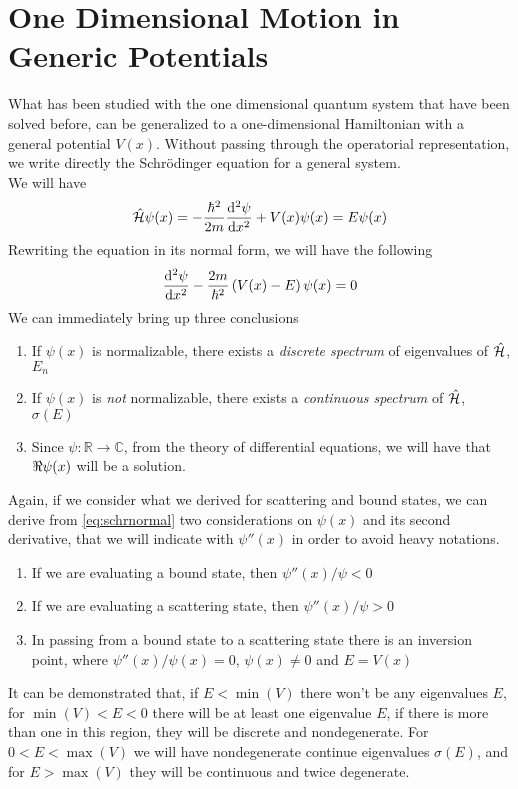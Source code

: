 \documentclass[../qm.tex]{subfiles}
\begin{document}
	\section{One Dimensional Motion in Generic Potentials}
	What has been studied with the one dimensional quantum system that have been solved before, can be generalized to a one-dimensional Hamiltonian with a general potential $V(x)$. Without passing through the operatorial representation, we write directly the Schrödinger equation for a general system.\\
	We will have
	\begin{equation*}
		\opr{\ham}\psi(x)=-\frac{\hbar^2}{2m}\derivative[2]{\psi}{x}+V(x)\psi(x)=E\psi(x)
	\end{equation*}
	Rewriting the equation in its normal form, we will have the following
	\begin{equation}
		\derivative[2]{\psi}{x}-\frac{2m}{\hbar^2}\left( V(x)-E \right)\psi(x)=0
		\label{eq:schrnormal}
	\end{equation}
	We can immediately bring up three conclusions
	\begin{enumerate}
	\item If $\psi(x)$ is normalizable, there exists a \textit{discrete spectrum} of eigenvalues of $\hat{\mathcal{H}}$, $E_n$
	\item If $\psi(x)$ is \emph{not} normalizable, there exists a \textit{continuous spectrum} of $\hat{\mathcal{H}}$, $\sigma(E)$
	\item Since $\psi:\mathbb{R}\to\mathbb{C}$, from the theory of differential equations, we will have that $\real{\psi(x)}$ will be a solution.\\
	\end{enumerate}
	Again, if we consider what we derived for scattering and bound states, we can derive from \eqref{eq:schrnormal} two considerations on $\psi(x)$ and its second derivative, that we will indicate with $\psi''(x)$ in order to avoid heavy notations.
	\begin{enumerate}
	\item If we are evaluating a bound state, then $\psi''(x)/\psi<0$
	\item If we are evaluating a scattering state, then $\psi''(x)/\psi>0$
	\item In passing from a bound state to a scattering state there is an inversion point, where $\psi''(x)/\psi(x)=0$, $\psi(x)\ne0$ and $E=V(x)$
	\end{enumerate}
	It can be demonstrated that, if $E<\min(V)$ there won't be any eigenvalues $E$, for $\min(V)<E<0$ there will be at least one eigenvalue $E$, if there is more than one in this region, they will be discrete and nondegenerate. For $0<E<\max(V)$ we will have nondegenerate continue eigenvalues $\sigma(E)$, and for $E>\max(V)$ they will be continuous and twice degenerate.\\
\end{document}
